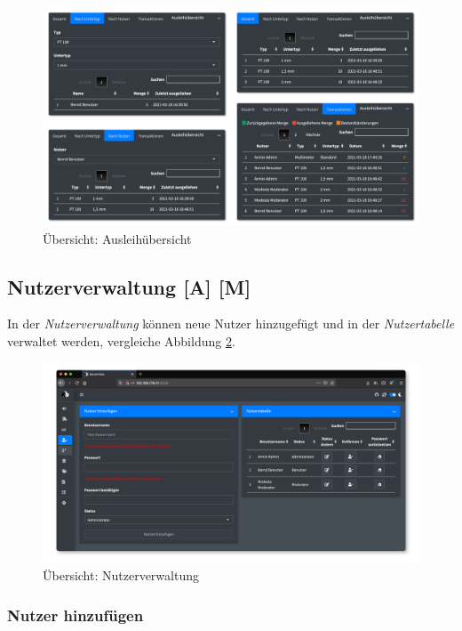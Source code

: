 \documentclass[
]{article}
\begin{document}
\begin{figure}
\centering
\includegraphics{./img/reporting_details.png}
\caption{\label{fig:reporting-details}Übersicht: Ausleihübersicht}
\end{figure}

\hypertarget{user-management}{%
\subsection{Nutzerverwaltung {[}A{]} {[}M{]}}\label{user-management}}

In der \emph{Nutzerverwaltung} können neue Nutzer hinzugefügt und in der \emph{Nutzertabelle} verwaltet werden, vergleiche Abbildung \ref{fig:user-management-overview}.

\begin{figure}
\centering
\includegraphics{./img/user_management_overview.png}
\caption{\label{fig:user-management-overview}Übersicht: Nutzerverwaltung}
\end{figure}

\hypertarget{nutzer-hinzufuxfcgen}{%
\subsubsection{Nutzer hinzufügen}\label{nutzer-hinzufuxfcgen}}
\end{document}
